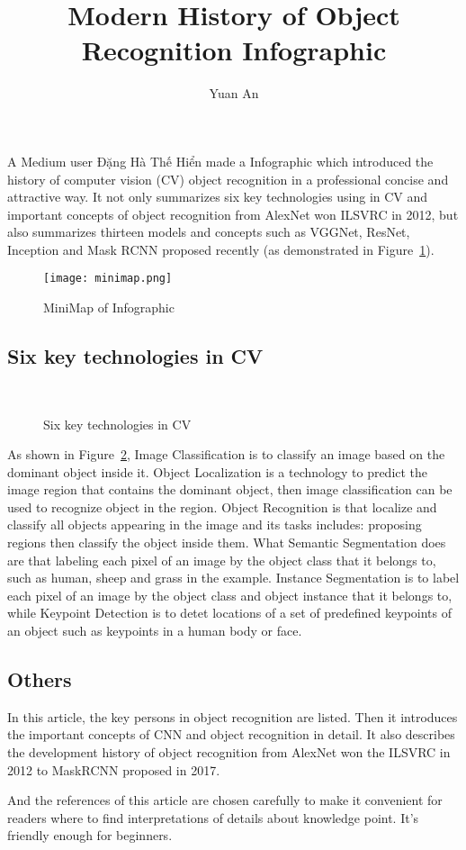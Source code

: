 \documentclass[a4paper, 12pt, twocolumn]{article}
\title{Modern History of Object Recognition Infographic}
\author{Yuan An}
\begin{document}
\maketitle
A Medium user Đặng Hà Thế Hiển made a Infographic\cite{MHoOR} which introduced the history of computer vision (CV) object recognition in a professional concise and attractive way. It not only summarizes six key technologies using in CV and important concepts of object recognition  from AlexNet won ILSVRC in 2012, but also summarizes thirteen models and concepts such as VGGNet, ResNet, Inception and Mask RCNN proposed recently (as demonstrated in Figure~\ref{minimap}).
\begin{figure}[h]
	\centering
	\texttt{[image: minimap.png]}
	\caption{MiniMap of Infographic}\label{minimap}
\end{figure}
\subsection*{Six key technologies in CV}
\begin{figure}[h]
	\centering
	\\
	\caption{Six key technologies in CV}\label{fig2}
\end{figure}
\par
As shown in Figure~\ref{fig2}, Image Classification is to classify an image based on the dominant object inside it. Object Localization is a technology to predict the image region that contains the dominant object, then image classification can be used to recognize object in the region. Object Recognition is that localize and classify all objects appearing in the image and its tasks includes: proposing regions then classify the object inside them. What Semantic Segmentation does are that labeling each pixel of an image by the object class that it belongs to, such as human, sheep and grass in the example. Instance Segmentation is to label each pixel of an image by the object class and object instance that it belongs to, while Keypoint Detection is to detet locations of a set of predefined keypoints of an object such as keypoints in a human body or face.
\subsection*{Others}
In this article, the key persons in object recognition are listed. Then it introduces the important concepts of CNN and object recognition in detail. It also describes the development history of object recognition from AlexNet won the ILSVRC in 2012 to MaskRCNN proposed in 2017.
\par
And the references of this article are chosen carefully to make it convenient for readers where to find interpretations of details about knowledge point. It's friendly enough for beginners.


\end{document}
